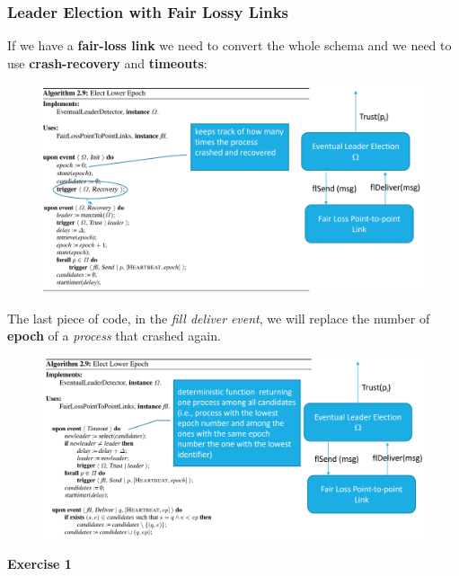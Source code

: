 \documentclass{article}
\begin{document}
\subsubsection{Leader Election with Fair Lossy Links}
If we have a\textbf{ fair-loss link} we need to convert the whole schema and we need to use \textbf{crash-recovery} and \textbf{timeouts}:
\begin{figure}[H]
  \centering
  \includegraphics[scale=0.8, left]{cattura25.png}
\end{figure}
The last piece of code, in the \emph{fill deliver} \emph{event}, we will replace the number of \textbf{epoch} of a \emph{process} that crashed again.
\begin{figure}[H]
  \centering
  \includegraphics[scale=0.8, left]{cattura24.png}
\end{figure}
\textbf{Exercise 1}
\end{document}

